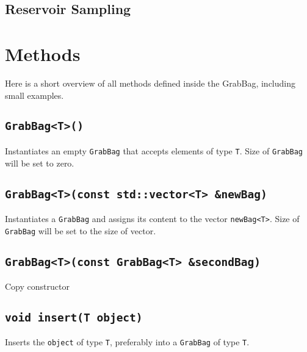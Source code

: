 \documentclass[a4paper,12pt]{article}
\begin{document}
\subsection{Reservoir Sampling}
  
\newpage
  
\section{Methods}

Here is a short overview of all methods defined inside the GrabBag, including small examples.


\subsection{\texttt{GrabBag<T>()}}

Instantiates an empty \texttt{GrabBag} that accepts elements of type \texttt{T}. 
Size of \texttt{GrabBag} will be set to zero.

 

\subsection{\texttt{GrabBag<T>(const std::vector<T> \&newBag)}}

Instantiates a \texttt{GrabBag} and assigns its content to the vector \texttt{newBag<T>}. 
Size of \texttt{GrabBag} will be set to the size of vector.

 

\newpage

\subsection{\texttt{GrabBag<T>(const GrabBag<T> \&secondBag)}}

Copy constructor



\subsection{\texttt{void insert(T object)}}

Inserts the \texttt{object} of type \texttt{T}, preferably into a \texttt{GrabBag} of type \texttt{T}.

 
\end{document}
